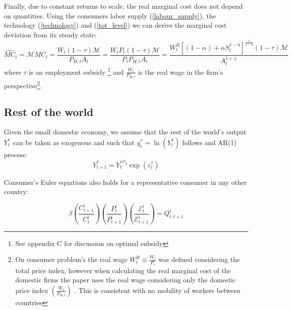 \documentclass{article}
\newcommand{\E}{\mathcal{E}}
\begin{document}
Finally, due to constant returns to scale, the real marginal cost does not depend on quantities. Using the consumers labor supply (\ref{labour_supply}), the technology (\ref{technology}) and (\ref{tot_level}) we can derive the marginal cost deviation from its steady state:
\begin{equation}
    \label{marginal_cost}
    \widehat{MC}_t = \mathcal M MC_t = \frac{W_t (1 - \tau) \mathcal M}{P_{H,t}A_t} = \frac{W_t P_t (1 - \tau)\mathcal M}{P_t P_{H,t}A_t}
    = \frac{W_t^R \left[(1-\alpha) + \alpha S_t^{1-\eta} \right]^{\frac{1}{1-\eta}} (1 - \tau) \mathcal M}{A_t^{1+\varphi}}
\end{equation}
where $\tau$ is an employment subsidy \footnote{See appendix C for discussion on optimal subsidy} and $\frac{W_t}{P_{H,t}}$ is the real wage in the firm's perspective\footnote{On consumer problem's the real wage $W_t^R \equiv \frac{W_t}{P_t}$ was defined considering the total price index, however when calculating the real marginal cost of the domestic firms the paper uses the real wage considering only the domestic price index $\left( \frac{W_t}{P_{H,t}}\right)$ . This is consistent with no mobility of workers between countries}.

\vspace{6pt}

\subsection{Rest of the world}
Given the small domestic economy, we assume that the rest of the world's output $Y_t^*$ can be taken as exogenous and such that $y_t^* = \ln(Y^*_t)$ follows and AR(1) process:
\begin{equation}
    \label{y_row}
    Y^*_{t+1} = {Y^*_t}^{\rho_y}\exp( \varepsilon^*_t)
\end{equation}

Consumer's Euler equations also holds for a representative consumer in any other country:

$$\beta \left( \frac{C^i_{t+1}}{C_t^i} \right) \left( \frac{P_t^i}{P^i_{t+1}} \right) \left( \frac{\E^i_t}{\E^i_{t+1}} \right) = Q^i_{t, t+1}$$
\end{document}
